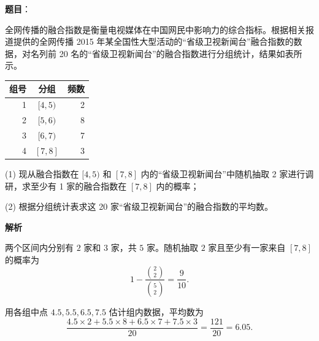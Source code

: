 \begin{answer}

\textbf{题目}：

全网传播的融合指数是衡量电视媒体在中国网民中影响力的综合指标。根据相关报道提供的全网传播 2015 年某全国性大型活动的“省级卫视新闻台”融合指数的数据，对名列前 20 名的“省级卫视新闻台”的融合指数进行分组统计，结果如表所示。

\begin{center}
\begin{tabular}{rcr}
\toprule
组号 & 分组 & 频数 \\
\midrule
1 & \([4,5)\) & 2 \\
2 & \([5,6)\) & 8 \\
3 & \([6,7)\) & 7 \\
4 & \([7,8]\) & 3 \\
\bottomrule
\end{tabular}
\end{center}

(1) 现从融合指数在 \([4,5)\) 和 \([7,8]\) 内的“省级卫视新闻台”中随机抽取 2 家进行调研，求至少有 1 家的融合指数在 \([7,8]\) 内的概率；

(2) 根据分组统计表求这 20 家“省级卫视新闻台”的融合指数的平均数。

\textbf{解析}


两个区间内分别有 \(2\) 家和 \(3\) 家，共 \(5\) 家。随机抽取 \(2\) 家且至少有一家来自 \([7,8]\) 的概率为
\nopagebreak[4]
\[
1-\frac{\binom22}{\binom52}=\frac9{10}.
\]


用各组中点 \(4.5,5.5,6.5,7.5\) 估计组内数据，平均数为
\nopagebreak[4]
\[
\frac{4.5\times2+5.5\times8+6.5\times7+7.5\times3}{20}
=\frac{121}{20}=6.05.
\]



\end{answer}
